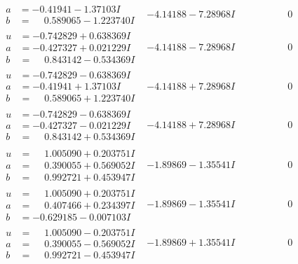 \documentclass[1p]{elsarticle_modified}
\theoremstyle{definition}
\begin{document}
$$\begin{array}{c|c|c}
\begin{aligned}
a &= -0.41941 - 1.37103 I \\
b &= \phantom{-}0.589065 - 1.223740 I\end{aligned}
 & -4.14188 - 7.28968 I & \phantom{-0.000000 } 0 \\ \hline\begin{aligned}
u &= -0.742829 + 0.638369 I \\
a &= -0.427327 + 0.021229 I \\
b &= \phantom{-}0.843142 - 0.534369 I\end{aligned}
 & -4.14188 - 7.28968 I & \phantom{-0.000000 } 0 \\ \hline\begin{aligned}
u &= -0.742829 - 0.638369 I \\
a &= -0.41941 + 1.37103 I \\
b &= \phantom{-}0.589065 + 1.223740 I\end{aligned}
 & -4.14188 + 7.28968 I & \phantom{-0.000000 } 0 \\ \hline\begin{aligned}
u &= -0.742829 - 0.638369 I \\
a &= -0.427327 - 0.021229 I \\
b &= \phantom{-}0.843142 + 0.534369 I\end{aligned}
 & -4.14188 + 7.28968 I & \phantom{-0.000000 } 0 \\ \hline\begin{aligned}
u &= \phantom{-}1.005090 + 0.203751 I \\
a &= \phantom{-}0.390055 + 0.569052 I \\
b &= \phantom{-}0.992721 + 0.453947 I\end{aligned}
 & -1.89869 - 1.35541 I & \phantom{-0.000000 } 0 \\ \hline\begin{aligned}
u &= \phantom{-}1.005090 + 0.203751 I \\
a &= \phantom{-}0.407466 + 0.234397 I \\
b &= -0.629185 - 0.007103 I\end{aligned}
 & -1.89869 - 1.35541 I & \phantom{-0.000000 } 0 \\ \hline\begin{aligned}
u &= \phantom{-}1.005090 - 0.203751 I \\
a &= \phantom{-}0.390055 - 0.569052 I \\
b &= \phantom{-}0.992721 - 0.453947 I\end{aligned}
 & -1.89869 + 1.35541 I & \phantom{-0.000000 } 0 \\ \hline\begin{aligned}

\end{aligned}
\end{array}$$
\end{document}
